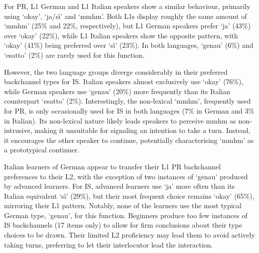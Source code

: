 \begin{styleStandard}
For PR, L1 German and L1 Italian speakers show a similar behaviour, primarily using ‘okay’, ‘ja/sì’ and ‘mmhm’. Both L1s display roughly the same amount of ‘mmhm’ (25\% and 22\%, respectively), but L1 German speakers prefer ‘ja’ (43\%) over ‘okay’ (22\%), while L1 Italian speakers show the opposite pattern, with ‘okay’ (41\%) being preferred over ‘sì’ (23\%). In both languages, ‘genau’ (6\%) and ‘esatto’ (2\%) are rarely used for this function.
\end{styleStandard}

\begin{styleStandard}
However, the two language groups diverge considerably in their preferred backchannel types for IS. Italian speakers almost exclusively use ‘okay’ (76\%), while German speakers use ‘genau’ (20\%) more frequently than its Italian counterpart ‘esatto’ (2\%). Interestingly, the non-lexical ‘mmhm’, frequently used for PR, is only occasionally used for IS in both languages (7\% in German and 3\% in Italian). Its non-lexical nature likely leads speakers to perceive {\textquotedbl}mmhm{\textquotedbl} as non-intrusive, making it unsuitable for signaling an intention to take a turn. Instead, it encourages the other speaker to continue, potentially characterising ‘mmhm’ as a prototypical continuer. 
\end{styleStandard}

\begin{styleStandard}
Italian learners of German appear to transfer their L1 PR backchannel preferences to their L2, with the exception of two instances of ‘genau’ produced by advanced learners. For IS, advanced learners use ‘ja’ more often than its Italian equivalent ‘sì’ (29\%), but their most frequent choice remains ‘okay’ (65\%), mirroring their L1 pattern. Notably, none of the learners use the most typical German type, ‘genau’, for this function. Beginners produce too few instances of IS backchannels (17 items only) to allow for firm conclusions about their type choices to be drawn. Their limited L2 proficiency may lead them to avoid actively taking turns, preferring to let their interlocutor lead the interaction. 
\end{styleStandard}

\begin{styleStandard}
  [Warning: Image ignored] %
 
\end{styleStandard}

